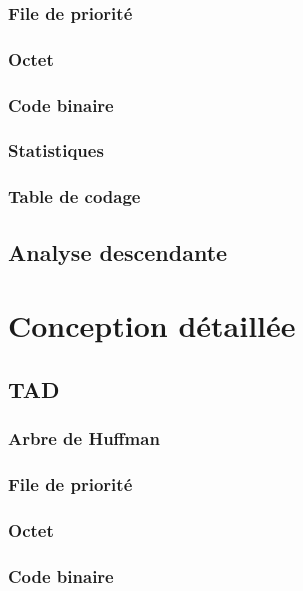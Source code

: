 \documentclass[12pt,a4paper]{article}
\begin{document}
\subsubsection{File de priorité}

\subsubsection{Octet}

\subsubsection{Code binaire}

\subsubsection{Statistiques}

\subsubsection{Table de codage}

\subsection{Analyse descendante}


\section{Conception détaillée}
\subsection{TAD}
\subsubsection{Arbre de Huffman}
%
\subsubsection{File de priorité}

\subsubsection{Octet}

\subsubsection{Code binaire}

\end{document}
